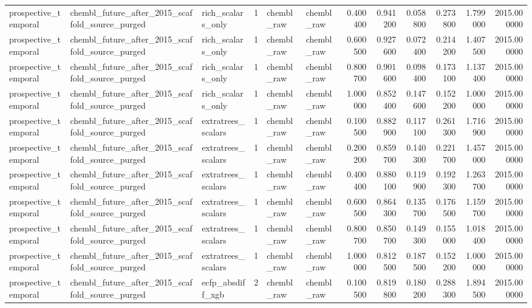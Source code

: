 \begin{longtable}{lllrllrrrrrr}
prospective\_temporal & chembl\_future\_after\_2015\_scaffold\_source\_purged & rich\_scalars\_only & 1 & chembl\_raw & chembl\_raw & 0.400400 & 0.941200 & 0.058800 & 0.273800 & 1.799000 & 2015.000000 \\
prospective\_temporal & chembl\_future\_after\_2015\_scaffold\_source\_purged & rich\_scalars\_only & 1 & chembl\_raw & chembl\_raw & 0.600500 & 0.927600 & 0.072400 & 0.214200 & 1.407500 & 2015.000000 \\
prospective\_temporal & chembl\_future\_after\_2015\_scaffold\_source\_purged & rich\_scalars\_only & 1 & chembl\_raw & chembl\_raw & 0.800700 & 0.901600 & 0.098400 & 0.173100 & 1.137400 & 2015.000000 \\
prospective\_temporal & chembl\_future\_after\_2015\_scaffold\_source\_purged & rich\_scalars\_only & 1 & chembl\_raw & chembl\_raw & 1.000000 & 0.852400 & 0.147600 & 0.152200 & 1.000000 & 2015.000000 \\
prospective\_temporal & chembl\_future\_after\_2015\_scaffold\_source\_purged & extratrees\_scalars & 1 & chembl\_raw & chembl\_raw & 0.100500 & 0.882900 & 0.117100 & 0.261300 & 1.716900 & 2015.000000 \\
prospective\_temporal & chembl\_future\_after\_2015\_scaffold\_source\_purged & extratrees\_scalars & 1 & chembl\_raw & chembl\_raw & 0.200200 & 0.859700 & 0.140300 & 0.221700 & 1.457000 & 2015.000000 \\
prospective\_temporal & chembl\_future\_after\_2015\_scaffold\_source\_purged & extratrees\_scalars & 1 & chembl\_raw & chembl\_raw & 0.400400 & 0.880100 & 0.119900 & 0.192300 & 1.263700 & 2015.000000 \\
prospective\_temporal & chembl\_future\_after\_2015\_scaffold\_source\_purged & extratrees\_scalars & 1 & chembl\_raw & chembl\_raw & 0.600500 & 0.864300 & 0.135700 & 0.176500 & 1.159700 & 2015.000000 \\
prospective\_temporal & chembl\_future\_after\_2015\_scaffold\_source\_purged & extratrees\_scalars & 1 & chembl\_raw & chembl\_raw & 0.800700 & 0.850700 & 0.149300 & 0.155000 & 1.018400 & 2015.000000 \\
prospective\_temporal & chembl\_future\_after\_2015\_scaffold\_source\_purged & extratrees\_scalars & 1 & chembl\_raw & chembl\_raw & 1.000000 & 0.812500 & 0.187500 & 0.152200 & 1.000000 & 2015.000000 \\
prospective\_temporal & chembl\_future\_after\_2015\_scaffold\_source\_purged & ecfp\_absdiff\_xgb & 2 & chembl\_raw & chembl\_raw & 0.100500 & 0.819800 & 0.180200 & 0.288300 & 1.894500 & 2015.000000 \\

\end{longtable}
